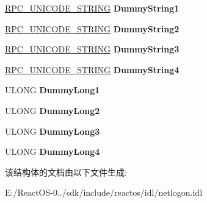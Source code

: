 \begin{DoxyCompactItemize}
\mbox{\label{struct___n_e_t_l_o_g_o_n___d_e_l_t_a___p_o_l_i_c_y_aeae608a1bf51eb1aaa3f938e5486b4cc}} 
\hyperlink{struct___r_p_c___u_n_i_c_o_d_e___s_t_r_i_n_g}{R\+P\+C\+\_\+\+U\+N\+I\+C\+O\+D\+E\+\_\+\+S\+T\+R\+I\+NG} {\bfseries Dummy\+String1}
\item 
\mbox{\label{struct___n_e_t_l_o_g_o_n___d_e_l_t_a___p_o_l_i_c_y_a987799dec5f1c67d16657f88a532a028}} 
\hyperlink{struct___r_p_c___u_n_i_c_o_d_e___s_t_r_i_n_g}{R\+P\+C\+\_\+\+U\+N\+I\+C\+O\+D\+E\+\_\+\+S\+T\+R\+I\+NG} {\bfseries Dummy\+String2}
\item 
\mbox{\label{struct___n_e_t_l_o_g_o_n___d_e_l_t_a___p_o_l_i_c_y_a147bcddf4f72e3eb46341bcc97132bf8}} 
\hyperlink{struct___r_p_c___u_n_i_c_o_d_e___s_t_r_i_n_g}{R\+P\+C\+\_\+\+U\+N\+I\+C\+O\+D\+E\+\_\+\+S\+T\+R\+I\+NG} {\bfseries Dummy\+String3}
\item 
\mbox{\label{struct___n_e_t_l_o_g_o_n___d_e_l_t_a___p_o_l_i_c_y_a4c3842315dd79ba319576e626a22a25d}} 
\hyperlink{struct___r_p_c___u_n_i_c_o_d_e___s_t_r_i_n_g}{R\+P\+C\+\_\+\+U\+N\+I\+C\+O\+D\+E\+\_\+\+S\+T\+R\+I\+NG} {\bfseries Dummy\+String4}
\item 
\mbox{\label{struct___n_e_t_l_o_g_o_n___d_e_l_t_a___p_o_l_i_c_y_aeda6a3f724614ede7ffef2f8e89adb12}} 
U\+L\+O\+NG {\bfseries Dummy\+Long1}
\item 
\mbox{\label{struct___n_e_t_l_o_g_o_n___d_e_l_t_a___p_o_l_i_c_y_aae7b33786332a158f4bb7febef17ad4d}} 
U\+L\+O\+NG {\bfseries Dummy\+Long2}
\item 
\mbox{\label{struct___n_e_t_l_o_g_o_n___d_e_l_t_a___p_o_l_i_c_y_a7f7f62a29a17f176e49db137eff7a219}} 
U\+L\+O\+NG {\bfseries Dummy\+Long3}
\item 
\mbox{\label{struct___n_e_t_l_o_g_o_n___d_e_l_t_a___p_o_l_i_c_y_af211993c686756d42a006ae7f63f617c}} 
U\+L\+O\+NG {\bfseries Dummy\+Long4}
\end{DoxyCompactItemize}


该结构体的文档由以下文件生成\+:\begin{DoxyCompactItemize}
\item 
E\+:/\+React\+O\+S-\/0../sdk/include/reactos/idl/netlogon.\+idl\end{DoxyCompactItemize}
